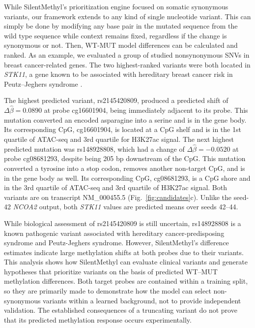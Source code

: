 \documentclass[11pt,letterpaper]{article}
\begin{document}
While SilentMethyl's prioritization engine focused on somatic synonymous variants, our framework extends to any kind of single nucleotide variant. This can simply be done by modifying any base pair in the mutated sequence from the wild type sequence while context remains fixed, regardless if the change is synonymous or not. Then, WT-MUT model differences can be calculated and ranked. As an example, we evaluated a group of studied nonsynonymous SNVs in breast cancer-related genes. The two highest-ranked variants were both located in \textit{STK11}, a gene known to be associated with hereditary breast cancer risk in Peutz--Jeghers syndrome \cite{lipsa2019stk11}.

The highest predicted variant, rs2145420809, produced a predicted shift of $\Delta\widehat\beta = 0.0890$ at probe cg16601904, being immediately adjacent to its probe. This mutation converted an encoded asparagine into a serine and is in the gene body. Its corresponding CpG, cg16601904, is located at a CpG shelf and is in the 1st quartile of ATAC-seq and 3rd quartile for H3K27ac signal. The next highest predicted mutation was rs148928808, which had a change of $\Delta\widehat\beta = -0.0520$ at probe cg08681293, despite being 205 bp downstream of the CpG. This mutation converted a tyrosine into a stop codon, removes another non-target CpG, and is in the gene body as well. Its corresponding CpG, cg08681293, is a CpG shore and in the 3rd quartile of ATAC-seq and 3rd quartile of H3K27ac signal. Both variants are on transcript NM\_000455.5 (Fig.~\ref{fig:candidates}c). Unlike the seed-42 \textit{NCOA2} output, both \textit{STK11} values are predicted means over seeds 42--44.

While biological assessment of rs2145420809 is still uncertain, rs148928808 is a known pathogenic variant associated with hereditary cancer-predisposing syndrome and Peutz-Jeghers syndrome. However, SilentMethyl's difference estimates indicate large methylation shifts at both probes due to their variants. This analysis shows how SilentMethyl can evaluate clinical variants and generate hypotheses that prioritize variants on the basis of predicted WT--MUT methylation differences. Both target probes are contained within a training split, so they are primarily made to demonstrate how the model can select non-synonymous variants within a learned background, not to provide independent validation. The established consequences of a truncating variant do not prove that its predicted methylation response occurs experimentally.
\end{document}
